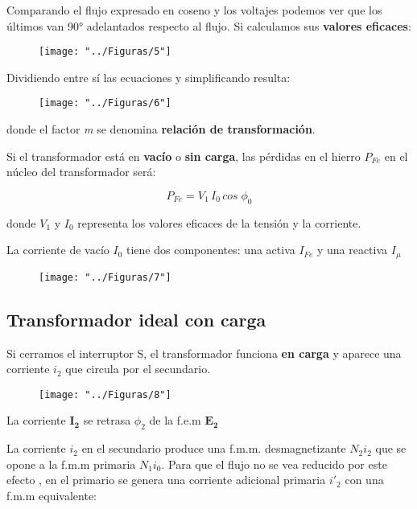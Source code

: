 Comparando el flujo expresado en coseno y los voltajes podemos ver que los últimos van 90° adelantados respecto al flujo. Si calculamos sus \textbf{valores eficaces}:

\begin{figure}[!htbp]
	\centering
	\texttt{[image: "../Figuras/5"]}
\end{figure} 

Dividiendo entre sí las ecuaciones y simplificando resulta:

\begin{figure}[H]
	\centering
	\texttt{[image: "../Figuras/6"]}
\end{figure} 

donde el factor \textit{m} se denomina \textbf{relación de transformación}.

Si el transformador está en \textbf{vacío} o \textbf{sin carga}, las pérdidas en el hierro $P_{Fe}$ en el núcleo del transformador será:

\begin{equation}
	P_{Fe} = V_{1}\,I_{0}\,cos\;\phi_{0}
\end{equation}

donde $V_{1}$ y $I_{0}$ representa los valores eficaces de la tensión y la corriente.

La corriente de vacío $I_{0}$ tiene dos componentes: una activa $I_{Fe}$ y una reactiva $I_{\mu}$

\begin{figure}[!htbp]
	\centering
	\texttt{[image: "../Figuras/7"]}
\end{figure} 

\subsection{Transformador ideal con carga}

Si cerramos el interruptor S, el transformador funciona \textbf{en carga} y aparece una corriente $i_{2}$ que circula por el secundario.
\begin{figure}[!htbp]
	\centering
	\texttt{[image: "../Figuras/8"]}
\end{figure} 

La corriente $\mathbf{I_{2}}$ se retrasa $\phi_{2}$ de la f.e.m $\mathbf{E_{2}}$

La corriente $i_{2}$ en el secundario produce una f.m.m. desmagnetizante $N_{2}i_{2}$ que se opone a la f.m.m primaria $N_{1}i_{0}$. Para que el flujo no se vea reducido por este efecto , en el primario se genera una corriente adicional primaria $i'_{2}$ con una f.m.m equivalente:

